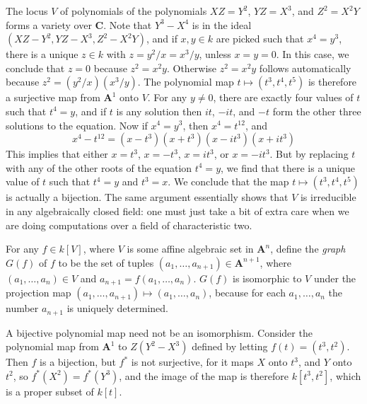 \begin{example}
    The locus $V$ of polynomials of the polynomials $XZ = Y^2$, $YZ = X^3$, and $Z^2 = X^2Y$ forms a variety over $\mathbf{C}$. Note that $Y^3 - X^4$ is in the ideal $(XZ - Y^2, YZ - X^3, Z^2 - X^2Y)$, and if $x,y \in k$ are picked such that $x^4 = y^3$, there is a unique $z \in k$ with $z = y^2/x = x^3/y$, unless $x = y = 0$. In this case, we conclude that $z = 0$ because $z^2 = x^2y$. Otherwise $z^2 = x^2y$ follows automatically because $z^2 = (y^2/x)(x^3/y)$. The polynomial map $t \mapsto (t^3,t^4,t^5)$ is therefore a surjective map from $\mathbf{A}^1$ onto $V$. For any $y \neq 0$, there are exactly four values of $t$ such that $t^4 = y$, and if $t$ is any solution then $it$, $-it$, and $-t$ form the other three solutions to the equation. Now if $x^4 = y^3$, then $x^4 = t^{12}$, and
    \[ x^4 - t^{12} = (x - t^3)(x + t^3)(x - it^3)(x + it^3) \]
    This implies that either $x = t^3$, $x = -t^3$, $x = it^3$, or $x = -it^3$. But by replacing $t$ with any of the other roots of the equation $t^4 = y$, we find that there is a unique value of $t$ such that $t^4 = y$ and $t^3 = x$. We conclude that the map $t \mapsto (t^3,t^4,t^5)$ is actually a bijection. The same argument essentially shows that $V$ is irreducible in any algebraically closed field: one must just take a bit of extra care when we are doing computations over a field of characteristic two.
\end{example}

\begin{example}
    For any $f \in k[V]$, where $V$ is some affine algebraic set in $\mathbf{A}^n$, define the \emph{graph} $G(f)$ of $f$ to be the set of tuples $(a_1, \dots, a_{n+1}) \in \mathbf{A}^{n+1}$, where $(a_1, \dots, a_n) \in V$ and $a_{n+1} = f(a_1, \dots, a_n)$. $G(f)$ is isomorphic to $V$ under the projection map $(a_1, \dots, a_{n+1}) \mapsto (a_1, \dots, a_n)$, because for each $a_1, \dots, a_n$ the number $a_{n+1}$ is uniquely determined.
\end{example}

\begin{example}
    A bijective polynomial map need not be an isomorphism. Consider the polynomial map from $\mathbf{A}^1$ to $Z(Y^2-X^3)$ defined by letting $f(t) = (t^3,t^2)$. Then $f$ is a bijection, but $f^*$ is not surjective, for it maps $X$ onto $t^3$, and $Y$ onto $t^2$, so $f^*(X^2) = f^*(Y^3)$, and the image of the map is therefore $k[t^3,t^2]$, which is a proper subset of $k[t]$.
\end{example}

